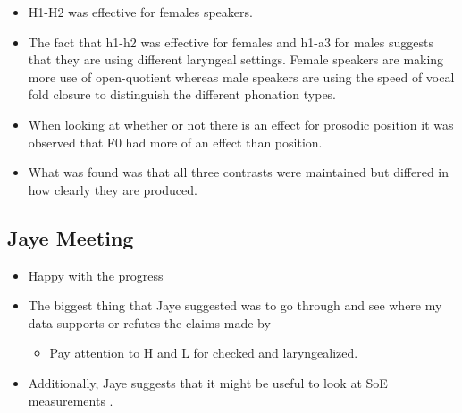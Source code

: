 \documentclass[12pt, letterpaper]{article}
\begin{document}
\begin{itemize}
	\item H1-H2 was effective for females speakers. 
	\item The fact that h1-h2 was effective for females and h1-a3 for males suggests that they are using different laryngeal settings. Female speakers are making more use of open-quotient whereas male speakers are using the speed of vocal fold closure to distinguish the different phonation types. 
	\item When looking at whether or not there is an effect for prosodic position it was observed that F0 had more of an effect than position. 
	\item What was found was that all three contrasts were maintained but differed in how clearly they are produced. 
\end{itemize}

\subsection{Jaye Meeting} \label{sec:Jaye}

\begin{itemize}
	\item Happy with the progress
	\item The biggest thing that Jaye suggested was to go through \citet{silvermanLaryngealComplexityOtomanguean1997} and see where my data supports or refutes the claims made by \citeauthor{silvermanLaryngealComplexityOtomanguean1997}
	\begin{itemize}
		\item Pay attention to H and L for checked and laryngealized. 
	\end{itemize}
	\item Additionally, Jaye suggests that it might be useful to look at SoE measurements \citep{hillenbrandAcousticCorrelatesBreathy1994,hillenbrandAcousticCorrelatesBreathy1996}.
\end{itemize}





\printbibliography[heading=bibintoc]
\end{document}
